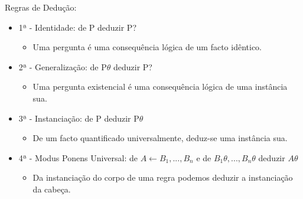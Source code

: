 \documentclass[../resumosPLOG.tex]{subfiles}
\begin{document}
Regras de Dedução:
\begin{itemize}
    \item 1ª - Identidade: de P deduzir P?
    \begin{itemize}
        \item Uma pergunta é uma consequência lógica de um facto idêntico.
    \end{itemize}
    \item 2ª - Generalização: de P\(\theta\) deduzir P?
    \begin{itemize}
        \item Uma pergunta existencial é uma consequência lógica de uma instância sua.
    \end{itemize}
    \item 3ª - Instanciação: de P deduzir P\(\theta\)
    \begin{itemize}
        \item De um facto quantificado universalmente, deduz-se uma instância sua.
    \end{itemize}
    \item 4ª - Modus Ponens Universal: de \(A \xleftarrow{} B_1, ..., B_n\) e de \(B_1\theta, ..., B_n\theta\) deduzir \(A\theta\)
    \begin{itemize}
        \item Da instanciação do corpo de uma regra podemos deduzir a instanciação da cabeça.
    \end{itemize}
\end{itemize}
\end{document}
